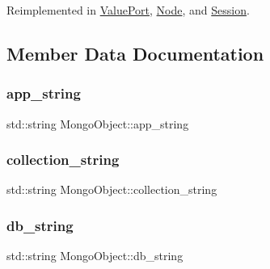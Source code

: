 Reimplemented in \hyperlink{class_value_port_a85845e2f4ee6cd21ffcd3942e60886ea}{Value\+Port}, \hyperlink{class_node_ad5cacb320e423275faef1bfc8c7a365b}{Node}, and \hyperlink{class_session_a513e5436b4c990985300246bb39d9f5c}{Session}.



\subsection{Member Data Documentation}
\mbox{\label{class_mongo_object_ace5148b45dd674c73077a044d0233ed8}} 
\subsubsection{\texorpdfstring{app\+\_\+string}{app\_string}}
{\footnotesize\ttfamily std\+::string Mongo\+Object\+::app\+\_\+string\hspace{0.3cm}{\ttfamily [protected]}}

\mbox{\label{class_mongo_object_a59d2d926fd2f8048b1dab88b3e1fea5b}} 
\subsubsection{\texorpdfstring{collection\+\_\+string}{collection\_string}}
{\footnotesize\ttfamily std\+::string Mongo\+Object\+::collection\+\_\+string\hspace{0.3cm}{\ttfamily [protected]}}

\mbox{\label{class_mongo_object_a215dc4379af5ac81e19d245f5d5d37e0}} 
\subsubsection{\texorpdfstring{db\+\_\+string}{db\_string}}
{\footnotesize\ttfamily std\+::string Mongo\+Object\+::db\+\_\+string\hspace{0.3cm}{\ttfamily [protected]}}

